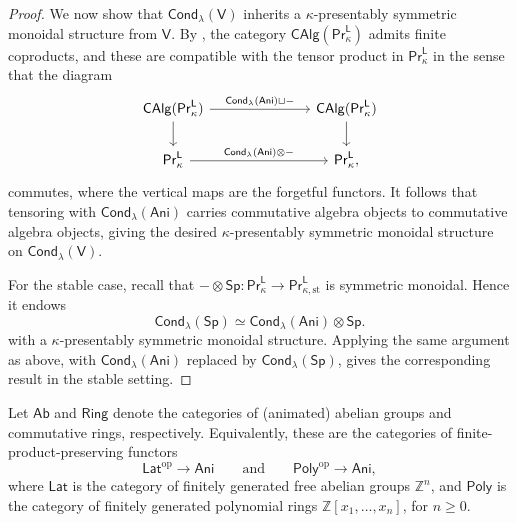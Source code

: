 \begin{proof}
We now show that $\mathsf{Cond}_\lambda(\mathsf{V})$ inherits a $\kappa$-presentably symmetric monoidal structure from $\mathsf{V}$. By \cite[Cor.~3.2.4.8]{higheralgebra}, the category $\mathsf{CAlg}(\mathsf{Pr}^\mathsf{L}_\kappa)$ admits finite coproducts, and these are compatible with the tensor product in $\mathsf{Pr}^\mathsf{L}_\kappa$ in the sense that the diagram
\[\begin{tikzcd}[ampersand replacement=\&]
	{\mathsf{CAlg}(\mathsf{Pr}^\mathsf{L}_\kappa)} \&\&\& {\mathsf{CAlg}(\mathsf{Pr}^\mathsf{L}_\kappa)} \\
	{\mathsf{Pr}^\mathsf{L}_\kappa} \&\&\& {\mathsf{Pr}^\mathsf{L}_\kappa,}
	\arrow["{\mathsf{Cond}_\lambda(\mathsf{Ani})\sqcup-}", from=1-1, to=1-4]
	\arrow[from=1-1, to=2-1]
	\arrow[from=1-4, to=2-4]
	\arrow["{\mathsf{Cond}_\lambda(\mathsf{Ani})\otimes-}", from=2-1, to=2-4]
\end{tikzcd}\]
commutes, where the vertical maps are the forgetful functors. It follows that tensoring with $\mathsf{Cond}_\lambda(\mathsf{Ani})$ carries commutative algebra objects to commutative algebra objects, giving the desired $\kappa$-presentably symmetric monoidal structure on $\mathsf{Cond}_\lambda(\mathsf{V})$.

For the stable case, recall that $-\otimes\mathsf{Sp}\colon\mathsf{Pr}^\mathsf{L}_\kappa\to\mathsf{Pr}^\mathsf{L}_{\kappa,\mathrm{st}}$ is symmetric monoidal. Hence it endows
\[\mathsf{Cond}_{\lambda}(\mathsf{Sp})\simeq \mathsf{Cond}_{\lambda}(\mathsf{Ani})\otimes \mathsf{Sp}.\]
with a $\kappa$-presentably symmetric monoidal structure. Applying the same argument as above, with $\mathsf{Cond}_{\lambda}(\mathsf{Ani})$ replaced by $\mathsf{Cond}_{\lambda}(\mathsf{Sp})$, gives the corresponding result in the stable setting.
\end{proof}

Let $\mathsf{Ab}$ and $\mathsf{Ring}$ denote the categories of (animated) abelian groups and commutative rings, respectively. Equivalently, these are the categories of finite-product-preserving functors
\[\mathsf{Lat}^\mathrm{op}\to \mathsf{Ani} \qquad\text{and}\qquad \mathsf{Poly}^\mathrm{op}\to \mathsf{Ani},\]
where $\mathsf{Lat}$ is the category of finitely generated free abelian groups $\mathbb{Z}^n$, and $\mathsf{Poly}$ is the category of finitely generated polynomial rings $\mathbb{Z}[x_1,\dots,x_n]$, for $n\geq 0$.

